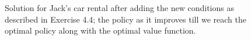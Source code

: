 \documentclass[12pt] {article}
\begin{document}
\begin{figure}[!tbh]
   \caption{Solution for Jack's car rental after adding the new conditions as described in Exercise 4.4; the policy as it improves till we reach the optimal policy along with the optimal value function.}
   \label{fig:bae}
\end{figure}
\end{document}
